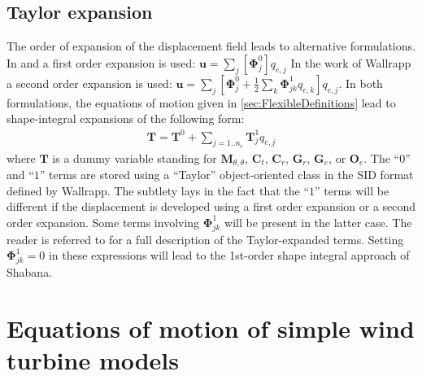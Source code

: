 \documentclass[wes, manuscript]{copernicus}
\renewcommand{\v}[1]{\boldsymbol{#1}}
\newcommand{\m}[1]{\boldsymbol{#1}}
\begin{document}
\subsection{Taylor expansion}
\label{sec:TaylorExpansion}
The order of expansion of the displacement field leads to alternative formulations.
In \cite{shabana:book} and \cite{branlard:2019flex} a first order expansion is used:
 $\v{u}=\sum_j [\m{\Phi}^0_j]q_{e,j}$
In the work of Wallrapp a second order expansion is used:
 $\v{u}=\sum_j \left[ \m{\Phi}^0_j + \frac{1}{2}\sum_k\m{\Phi}^1_{jk} q_{e,k}  \right]q_{e,j}$.
In both formulations, the equations of motion given in \autoref{sec:FlexibleDefinitions} lead to shape-integral expansions of the following form:
\begin{align}
\m{T} = \m{T}^0 
    + \sum\limits_{j=1..n_e} \m{T}^1_j q_{e,j}
\end{align}
where $\m{T}$ is a dummy variable standing for $\m{M}_{\theta,\theta}$, $\m{C}_t$, $\m{C}_r$, $\v{G}_r$, $\v{G}_e$, or $\v{O}_e$.
The ``$0$'' and ``$1$'' terms are stored using a ``Taylor'' object-oriented class in the SID format defined by Wallrapp.
The subtlety lays in the fact that the ``$1$'' terms will be different if the displacement is developed using a first order expansion or a second order expansion.
Some terms involving $\m{\Phi}^1_{jk}$ will be present in the latter case.
The reader is referred to \cite{Wallrapp:1993} for a full description of the Taylor-expanded terms.
Setting $\m{\Phi}^1_{jk}=0$ in these expressions will lead to the 1st-order shape integral approach of Shabana.





\section{Equations of motion of simple wind turbine models}
\end{document}
